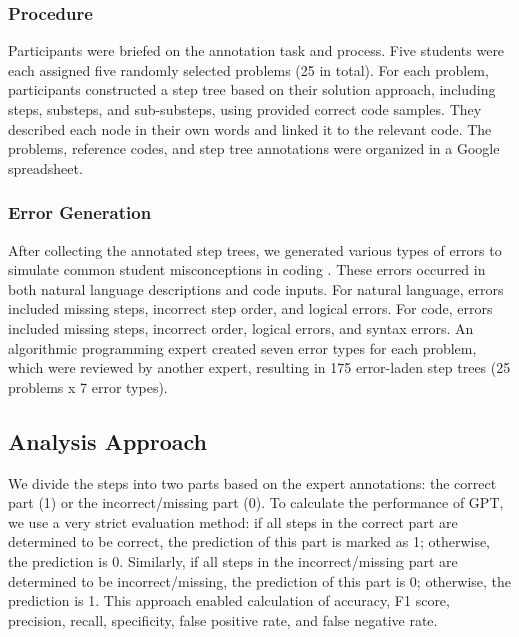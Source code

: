 

\subsubsection{Procedure} Participants were briefed on the annotation task and process. Five students were each assigned five randomly selected problems (25 in total). For each problem, participants constructed a step tree based on their solution approach, including steps, substeps, and sub-substeps, using provided correct code samples. They described each node in their own words and linked it to the relevant code. The problems, reference codes, and step tree annotations were organized in a Google spreadsheet.

\subsubsection{Error Generation} After collecting the annotated step trees, we generated various types of errors to simulate common student misconceptions in coding \cite{qian2017students}. These errors occurred in both natural language descriptions and code inputs. For natural language, errors included missing steps, incorrect step order, and logical errors. For code, errors included missing steps, incorrect order, logical errors, and syntax errors. An algorithmic programming expert created seven error types for each problem, which were reviewed by another expert, resulting in 175 error-laden step trees (25 problems x 7 error types).

\subsection{Analysis Approach} We divide the steps into two parts based on the expert annotations: the correct part (1) or the incorrect/missing part (0). To calculate the performance of GPT, we use a very strict evaluation method: if all steps in the correct part are determined to be correct, the prediction of this part is marked as 1; otherwise, the prediction is 0. Similarly, if all steps in the incorrect/missing part are determined to be incorrect/missing, the prediction of this part is 0; otherwise, the prediction is 1. This approach enabled calculation of accuracy, F1 score, precision, recall, specificity, false positive rate, and false negative rate.



